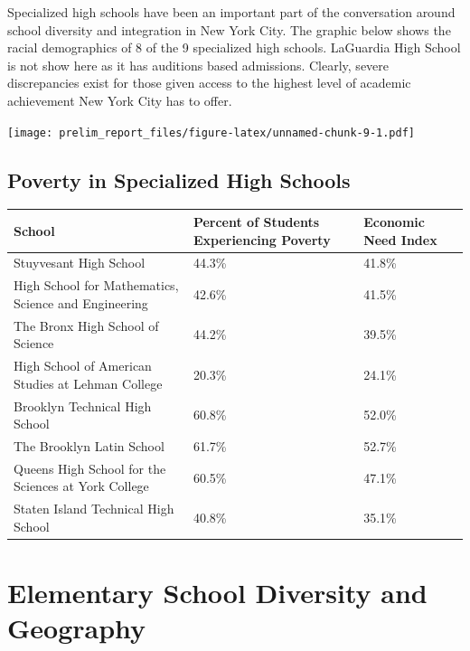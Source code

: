 \documentclass[11pt,]{article}
\begin{document}
Specialized high schools have been an important part of the conversation around school diversity and integration in New York City. The graphic below shows the racial demographics of 8 of the 9 specialized high schools. LaGuardia High School is not show here as it has auditions based admissions. Clearly, severe discrepancies exist for those given access to the highest level of academic achievement New York City has to offer.

\texttt{[image: prelim\_report\_files/figure-latex/unnamed-chunk-9-1.pdf]}

\hypertarget{poverty-in-specialized-high-schools}{%
\subsection{Poverty in Specialized High Schools}\label{poverty-in-specialized-high-schools}}
\begin{tabular}{l|l|l}
\hline
School & Percent of Students Experiencing Poverty & Economic Need Index\\
\hline
Stuyvesant High School & 44.3\% & 41.8\%\\
\hline
High School for Mathematics, Science and Engineering & 42.6\% & 41.5\%\\
\hline
The Bronx High School of Science & 44.2\% & 39.5\%\\
\hline
High School of American Studies at Lehman College & 20.3\% & 24.1\%\\
\hline
Brooklyn Technical High School & 60.8\% & 52.0\%\\
\hline
The Brooklyn Latin School & 61.7\% & 52.7\%\\
\hline
Queens High School for the Sciences at York College & 60.5\% & 47.1\%\\
\hline
Staten Island Technical High School & 40.8\% & 35.1\%\\
\hline
\end{tabular}
\hypertarget{elementary-school-diversity-and-geography}{%
\section{Elementary School Diversity and Geography}\label{elementary-school-diversity-and-geography}}
\end{document}
